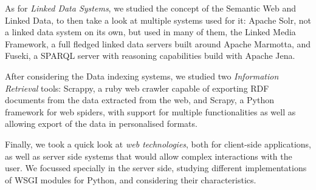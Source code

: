 As for \emph{Linked Data Systems}, we studied the concept of the Semantic Web and Linked Data, to then take a look at multiple systems used for it: Apache Solr, not a linked data system on its own, but used in many of them, the Linked Media Framework, a full fledged linked data servers built around Apache Marmotta, and Fuseki, a SPARQL server with reasoning capabilities build with Apache Jena.

After considering the Data indexing systems, we studied two \emph{Information Retrieval} tools: Scrappy, a ruby web crawler capable of exporting RDF documents from the data extracted from the web, and Scrapy, a Python framework for web spiders, with support for multiple functionalities as well as allowing export of the data in personalised formats.

Finally, we took a quick look at \emph{web technologies}, both for client-side applications, as well as server side systems that would allow complex interactions with the user. We focussed specially in the server side, studying different implementations of WSGI modules for Python, and considering their characteristics.
